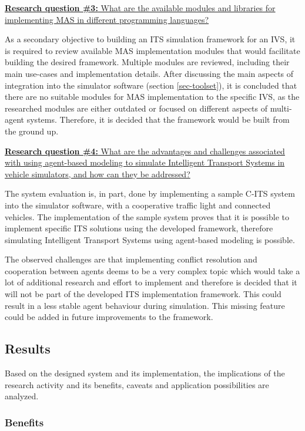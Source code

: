 \documentclass[0main.tex]{subfiles}
\begin{document}
\ul{\textbf{Research question \#3:} What are the available modules and libraries for
implementing MAS in different programming languages? }

As a secondary objective to building an ITS simulation framework for an IVS, it is required to
review available MAS implementation modules that would facilitate building the desired
framework. Multiple modules are reviewed, including their main use-cases and implementation
details. After discussing the main aspects of integration into the simulator software (section
\ref{sec-toolset}), it is concluded that there are no suitable modules for MAS implementation
to the specific IVS, as the researched modules are either outdated or focused on different
aspects of multi-agent systems. Therefore, it is decided that the framework would be built
from the ground up.

\ul{\textbf{Research question \#4:} What are the advantages and challenges associated with
using agent-based modeling to simulate Intelligent Transport Systems in vehicle simulators, and
how can they be addressed?}

The system evaluation is, in part, done by implementing a sample C-ITS system into the
simulator software, with a cooperative traffic light and connected vehicles. The implementation
of the sample system proves that it is possible to implement specific ITS solutions using
the developed framework, therefore simulating Intelligent Transport Systems using agent-based
modeling is possible.

The observed challenges are that implementing conflict resolution and cooperation between
agents deems to be a very complex topic which would take a lot of additional research and
effort to implement and therefore is decided that it will not be part of the developed ITS
implementation framework. This could result in a less stable agent behaviour during simulation.
This missing feature could be added in future improvements to the framework.

\subsection{Results}

Based on the designed system and its implementation, the implications of the research activity
and its benefits, caveats and application possibilities are analyzed. 

\subsubsection{Benefits}
\end{document}
